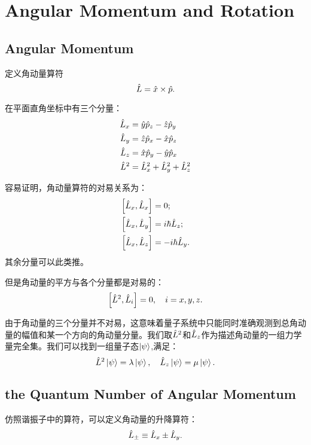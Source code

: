 \chapter{Angular Momentum and Rotation}
\section{Angular Momentum}
定义角动量算符\begin{equation}
    \hat{L}=\hat{x}\times\hat{p}.
\end{equation}

在平面直角坐标中有三个分量：
\begin{align}
    \hat{L}_x&=\hat{y}\hat{p}_z-\hat{z}\hat{p}_y\\
    \hat{L}_y&=\hat{z}\hat{p}_x-\hat{x}\hat{p}_z\\
    \hat{L}_z&=\hat{x}\hat{p}_y-\hat{y}\hat{p}_x\\
    \hat{L}^2&=\hat{L}_x^2+\hat{L}_y^2+\hat{L}_z^2
\end{align}

容易证明，角动量算符的对易关系为：
\begin{align}
    \left[\hat{L}_x,\hat{L}_x\right]&=0;\\
    \left[\hat{L}_x,\hat{L}_y\right]&=i\hbar\hat{L}_z;\\
    \left[\hat{L}_x,\hat{L}_z\right]&=-i\hbar\hat{L}_y.
\end{align}
其余分量可以此类推。

但是角动量的平方与各个分量都是对易的：
\begin{equation}
    \left[\hat{L}^2,\hat{L}_i\right]=0, \quad i=x,y,z.
\end{equation}

由于角动量的三个分量并不对易，这意味着量子系统中只能同时准确观测到总角动量的幅值和某一个方向的角动量分量。我们取$\hat{L}^2$和$\hat{L}_z$作为描述角动量的一组力学量完全集。我们可以找到一组量子态$\left|\psi\right>$,满足：
\begin{equation}
    \hat{L}^2\left|\psi\right>=\lambda\left|\psi\right>,\quad \hat{L}_z\left|\psi\right>=\mu\left|\psi\right>.
\end{equation}

\section{the Quantum Number of Angular Momentum}

仿照谐振子中的算符，可以定义角动量的升降算符：
\begin{equation}
    \hat{L}_\pm\equiv \hat{L}_x\pm\hat{L}_y.
\end{equation}

